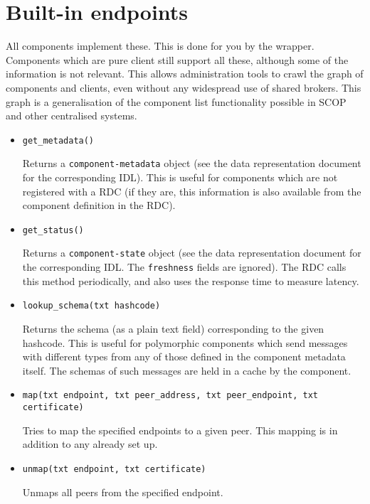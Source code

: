 \documentclass[12pt,a4paper,twoside]{article}
\renewcommand{\_}{\texttt{\symbol{95}}}
\begin{document}
\newpage
\section{Built-in endpoints}
\label{builtin}

All components implement these. This is done for you by the wrapper.
Components which are pure client still support all these,
although some of the information is not relevant.
This allows administration tools to crawl the graph of components and
clients, even without any widespread use of shared brokers. This graph
is a generalisation of the component list functionality possible in
SCOP and other centralised systems.

\begin{itemize}

\item \verb^get_metadata()^

Returns a \verb^component-metadata^ object (see the data representation
document for the corresponding IDL). This is useful for components
which are not registered with a RDC (if they are, this information
is also available from the component definition in the RDC).

\item \verb^get_status()^

Returns a \verb^component-state^ object (see the data representation
document for the corresponding IDL. The \verb^freshness^
fields are ignored). The RDC calls this
method periodically, and also uses the response time to
measure latency.

\item \verb^lookup_schema(txt hashcode)^

Returns the schema (as a plain text field)
corresponding to the given hashcode. This is useful for polymorphic
components which send messages with different types from any of
those defined in the component metadata itself. The schemas of
such messages are held in a cache by the component.

\item \verb^map(txt endpoint, txt peer_address, txt peer_endpoint, txt certificate)^

Tries to map the specified endpoints to a given peer. This mapping
is in addition to any already set up.

\item \verb^unmap(txt endpoint, txt certificate)^

Unmaps all peers from the specified endpoint.


\end{itemize}
\end{document}
